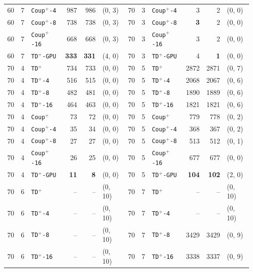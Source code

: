 \documentclass[letterpaper]{article}
\begin{document}
\begin{table}[t]
{\begin{tabular}{rrlrrl|rrlrrl}
60 & 7 & \texttt{Coup}$^+$\texttt{-4} & 987 & 986 & (0, 3) & 70 & 3 & \texttt{Coup}$^+$\texttt{-4} & 3 & 2 & (0, 0) \\
60 & 7 & \texttt{Coup}$^+$\texttt{-8} & 738 & 738 & (0, 3) & 70 & 3 & \texttt{Coup}$^+$\texttt{-8} & \textbf{3} & 2 & (0, 0) \\
60 & 7 & \texttt{Coup}$^+$\texttt{-16} & 668 & 668 & (0, 3) & 70 & 3 & \texttt{Coup}$^+$\texttt{-16} & 3 & 2 & (0, 0) \\
60 & 7 & \texttt{TD}$^+$\texttt{-GPU} & \textbf{333} & \textbf{331} & (4, 0) & 70 & 3 & \texttt{TD}$^+$\texttt{-GPU} & 4 & \textbf{1} & (0, 0) \\
\midrule
70 & 4 & \texttt{TD}$^+$ & 734 & 733 & (0, 0) & 70 & 5 & \texttt{TD}$^+$ & 2872 & 2871 & (0, 7) \\
70 & 4 & \texttt{TD}$^+$\texttt{-4} & 516 & 515 & (0, 0) & 70 & 5 & \texttt{TD}$^+$\texttt{-4} & 2068 & 2067 & (0, 6) \\
70 & 4 & \texttt{TD}$^+$\texttt{-8} & 482 & 481 & (0, 0) & 70 & 5 & \texttt{TD}$^+$\texttt{-8} & 1890 & 1889 & (0, 6) \\
70 & 4 & \texttt{TD}$^+$\texttt{-16} & 464 & 463 & (0, 0) & 70 & 5 & \texttt{TD}$^+$\texttt{-16} & 1821 & 1821 & (0, 6) \\
70 & 4 & \texttt{Coup}$^+$ & 73 & 72 & (0, 0) & 70 & 5 & \texttt{Coup}$^+$ & 779 & 778 & (0, 2) \\
70 & 4 & \texttt{Coup}$^+$\texttt{-4} & 35 & 34 & (0, 0) & 70 & 5 & \texttt{Coup}$^+$\texttt{-4} & 368 & 367 & (0, 2) \\
70 & 4 & \texttt{Coup}$^+$\texttt{-8} & 27 & 27 & (0, 0) & 70 & 5 & \texttt{Coup}$^+$\texttt{-8} & 513 & 512 & (0, 1) \\
70 & 4 & \texttt{Coup}$^+$\texttt{-16} & 26 & 25 & (0, 0) & 70 & 5 & \texttt{Coup}$^+$\texttt{-16} & 677 & 677 & (0, 0) \\
70 & 4 & \texttt{TD}$^+$\texttt{-GPU} & \textbf{11} & \textbf{8} & (0, 0) & 70 & 5 & \texttt{TD}$^+$\texttt{-GPU} & \textbf{104} & \textbf{102} & (2, 0) \\
\midrule
70 & 6 & \texttt{TD}$^+$ & -- & -- & (0, 10) & 70 & 7 & \texttt{TD}$^+$ & -- & -- & (0, 10) \\
70 & 6 & \texttt{TD}$^+$\texttt{-4} & -- & -- & (0, 10) & 70 & 7 & \texttt{TD}$^+$\texttt{-4} & -- & -- & (0, 10) \\
70 & 6 & \texttt{TD}$^+$\texttt{-8} & -- & -- & (0, 10) & 70 & 7 & \texttt{TD}$^+$\texttt{-8} & 3429 & 3429 & (0, 9) \\
70 & 6 & \texttt{TD}$^+$\texttt{-16} & -- & -- & (0, 10) & 70 & 7 & \texttt{TD}$^+$\texttt{-16} & 3338 & 3337 & (0, 9) \\

\end{tabular}}
\end{table}
\end{document}
